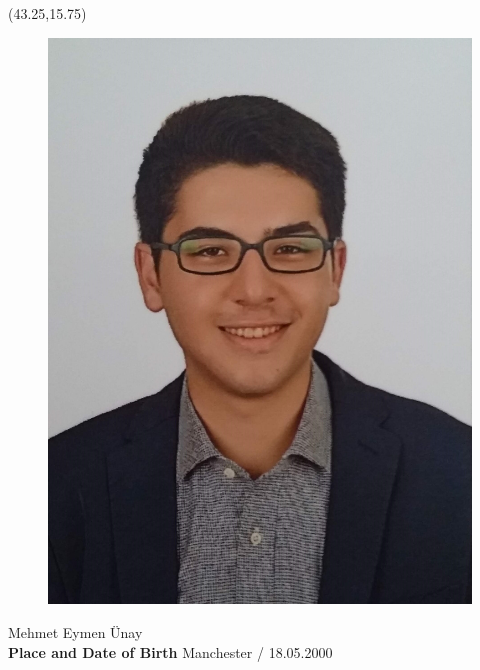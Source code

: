 \vspace*{10mm}
\setlength{\TPHorizModule}{10pt}
\setlength{\TPVertModule}{10pt}
\begin{textblock}{1}(43.25,15.75) %
	\begin{figure}[p]
		\includegraphics[scale=0.05,keepaspectratio=true]{cv-photo/eymen.png}
	\end{figure}	
\end{textblock}
\vspace*{20mm}
\textbf{\makebox[1.6cm]{\hfill \textbf{:}}}\hspace{0.225em} Mehmet Eymen Ünay \\ %

\textbf{Place and Date of Birth\makebox[0.735cm]{\hfill \textbf{:}}}\hspace{0.225em} Manchester / 18.05.2000 \\ %

